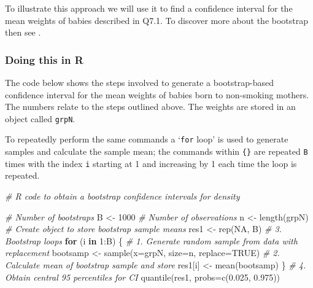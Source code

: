 \documentclass[
  oneside]{krantz}
\newenvironment{Shaded}{\begin{snugshade}}{\end{snugshade}}
\newcommand{\AttributeTok}[1]{\textcolor[rgb]{0.77,0.63,0.00}{#1}}
\newcommand{\CommentTok}[1]{\textcolor[rgb]{0.56,0.35,0.01}{\textit{#1}}}
\newcommand{\ConstantTok}[1]{\textcolor[rgb]{0.00,0.00,0.00}{#1}}
\newcommand{\ControlFlowTok}[1]{\textcolor[rgb]{0.13,0.29,0.53}{\textbf{#1}}}
\newcommand{\DecValTok}[1]{\textcolor[rgb]{0.00,0.00,0.81}{#1}}
\newcommand{\FloatTok}[1]{\textcolor[rgb]{0.00,0.00,0.81}{#1}}
\newcommand{\FunctionTok}[1]{\textcolor[rgb]{0.00,0.00,0.00}{#1}}
\newcommand{\NormalTok}[1]{#1}
\newcommand{\OtherTok}[1]{\textcolor[rgb]{0.56,0.35,0.01}{#1}}
\newcommand{\SpecialCharTok}[1]{\textcolor[rgb]{0.00,0.00,0.00}{#1}}
\begin{document}
To illustrate this approach we will use it to find a confidence interval for the mean weights of babies described in Q7.1. To discover more about the bootstrap then see \citep{Davison1997}.

\hypertarget{doing-this-in-r-10}{%
\subsubsection{Doing this in R}\label{doing-this-in-r-10}}

The code below shows the steps involved to generate a bootstrap-based confidence interval for the mean weights of babies born to non-smoking mothers. The numbers relate to the steps outlined above. The weights are stored in an object called \texttt{grpN}.

To repeatedly perform the same commands a `\texttt{for} loop' is used to generate samples and calculate the sample mean; the commands within \texttt{\{\}} are repeated \texttt{B} times with the index \texttt{i} starting at 1 and increasing by 1 each time the loop is repeated.

\begin{Shaded}
\begin{Highlighting}[]
\CommentTok{\# R code to obtain a bootstrap confidence intervals for density}

\CommentTok{\# Number of bootstraps}
\NormalTok{B }\OtherTok{\textless{}{-}} \DecValTok{1000}
\CommentTok{\# Number of observations}
\NormalTok{n }\OtherTok{\textless{}{-}} \FunctionTok{length}\NormalTok{(grpN)}
\CommentTok{\# Create object to store bootstrap sample means}
\NormalTok{res1 }\OtherTok{\textless{}{-}} \FunctionTok{rep}\NormalTok{(}\ConstantTok{NA}\NormalTok{, B)}
\CommentTok{\# 3. Bootstrap loops}
\ControlFlowTok{for}\NormalTok{ (i }\ControlFlowTok{in} \DecValTok{1}\SpecialCharTok{:}\NormalTok{B) \{}
  \CommentTok{\# 1. Generate random sample from data with replacement}
\NormalTok{  bootsamp }\OtherTok{\textless{}{-}} \FunctionTok{sample}\NormalTok{(}\AttributeTok{x=}\NormalTok{grpN, }\AttributeTok{size=}\NormalTok{n, }\AttributeTok{replace=}\ConstantTok{TRUE}\NormalTok{)}
  \CommentTok{\# 2. Calculate mean of bootstrap sample and store}
\NormalTok{  res1[i] }\OtherTok{\textless{}{-}} \FunctionTok{mean}\NormalTok{(bootsamp) }
\NormalTok{\}}
\CommentTok{\# 4. Obtain central 95 percentiles for CI}
\FunctionTok{quantile}\NormalTok{(res1, }\AttributeTok{probs=}\FunctionTok{c}\NormalTok{(}\FloatTok{0.025}\NormalTok{, }\FloatTok{0.975}\NormalTok{))}
\end{Highlighting}
\end{Shaded}
\end{document}
